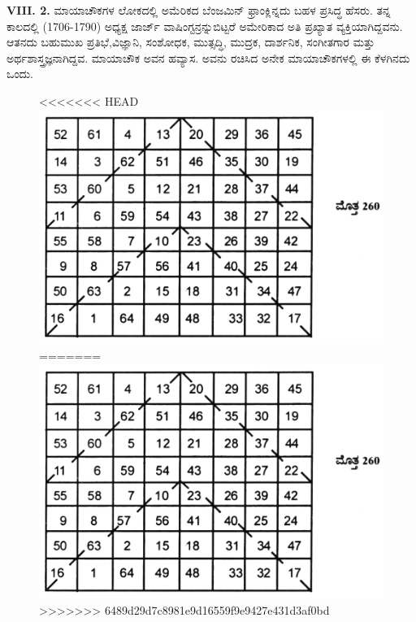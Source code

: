 \textbf{VIII. 2.} ಮಾಯಾಚೌಕಗಳ ಲೋಕದಲ್ಲಿ ಅಮೆರಿಕದ ಬೆಂಜಮಿನ್ ಫ್ರಾಂಕ್ಲಿನ್ನದು ಬಹಳ ಪ್ರಸಿದ್ಧ ಹೆಸರು. ತನ್ನ ಕಾಲದಲ್ಲಿ (1706-1790) ಅಧ್ಯಕ್ಷ ಜಾರ್ಜ್ ವಾಷಿಂಗ್ಟನ್ರನ್ನು\break ಬಿಟ್ಟರೆ ಅಮೇರಿಕಾದ ಅತಿ ಪ್ರಖ್ಯಾತ ವ್ಯಕ್ತಿಯಾಗಿದ್ದವನು. ಆತನದು ಬಹುಮುಖ ಪ್ರತಿಭೆ,\break ವಿಜ್ಞಾನಿ, ಸಂಶೋಧಕ, ಮುತ್ಸದ್ಧಿ, ಮುದ್ರಕ, ದಾರ್ಶನಿಕ, ಸಂಗೀತಗಾರ ಮತ್ತು ಅರ್ಥ\-ಶಾಸ್ತ್ರಜ್ಞನಾಗಿದ್ದವ. ಮಾಯಾಚೌಕ ಅವನ ಹವ್ಯಾಸ. ಅವನು ರಚಿಸಿದ ಅನೇಕ ಮಾಯಾಚೌಕಗಳಲ್ಲಿ ಈ ಕೆಳಗಿನದು ಒಂದು.
\begin{figure}[H]
<<<<<<< HEAD
\includegraphics{src/figures/chap7/fig7-2.jpg}
=======
\includegraphics[scale=0.8]{src/figures/chap7/fig7.2.jpg}
>>>>>>> 6489d29d7c8981e9d16559f9e9427e431d3af0bd
\end{figure}

